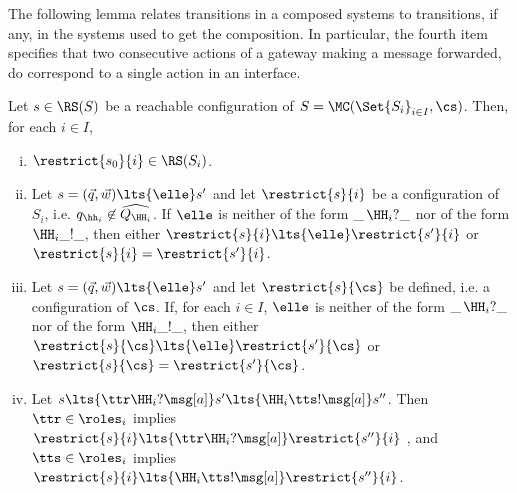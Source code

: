 The following lemma relates transitions in a composed systems to transitions, if any, in the systems
used to get the composition. In particular, the fourth item specifies that two consecutive
actions of a gateway making a message forwarded, do correspond to a single action in an interface.
\begin{lemma}
\label{lem:indrestrict}
Let $s\in \RS(S)$ be a reachable configuration of $S = \MC(\Set{S_i}_{i\in I}, \cs)$. Then, for each $i\in I$,
\begin{enumerate}[i)]
\item\label{lem:indrestrict1}
$\restrict{s_0}{i}\in \RS(S_i)$.
\item\label{lem:indrestrict2}
Let $s = (\vec{q},\vec{w})\lts{\elle}s'$
 and let  $\restrict{s}{i}$ be a configuration of $S_i$, i.e.  $q_{\hh_i}\not\in\widehat{Q_{\HH_i}}$. 
If $\elle$ is neither of the form $\_\,\HH_i?\_$ nor of the form $\HH_i\_!\_$,
then either $\restrict{s}{i}\lts{\elle}\restrict{s'}{i}$ or  $\restrict{s}{i}=\restrict{s'}{i}$.

\item\label{lem:indrestrict2cs}
 Let $s = (\vec{q},\vec{w})\lts{\elle}s'$
 and let  $\restrict{s}{\cs}$ be defined, i.e. a configuration of $\cs$.
If, for each $i\in I$,  $\elle$ is neither of the form $\_\,\HH_i?\_$ nor of the form $\HH_i\_!\_$,
then either $\restrict{s}{\cs}\lts{\elle}\restrict{s'}{\cs}$ or  $\restrict{s}{\cs}=\restrict{s'}{\cs}$.


\item\label{lem:indrestrict3}
Let $s\lts{\ttr\HH_i?\msg[a]} s'\lts{\HH_i\tts!\msg[a]} s''$.
Then $\ttr \in \roles_i$ implies  $\restrict{s}{i}\lts{\ttr\HH_i?\msg[a]}\restrict{s''}{i}$ ,
 and $\tts \in \roles_i$ implies  $\restrict{s}{i}\lts{\HH_i\tts!\msg[a]}\restrict{s''}{i}$. 
\end{enumerate}
\end{lemma}

